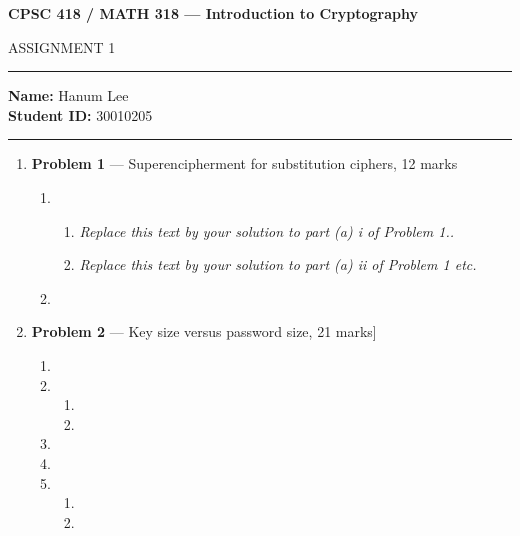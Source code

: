 \documentclass[11pt]{article}
\theoremstyle{definition}
\begin{document}
\begin{center}
{\bf \Large CPSC 418 / MATH 318 --- Introduction to Cryptography

ASSIGNMENT 1 %
}
\end{center}

\hrule 	

\textbf{Name:} Hanum Lee  \\
\textbf{Student ID:} 30010205 

\medskip \hrule

\begin{enumerate}

\item[] \textbf{Problem 1} --- Superencipherment for substitution ciphers, 12 marks

\begin{enumerate}
\item
\begin{enumerate}
\item \emph{Replace this text by your solution to part (a) i of Problem 1..}

\item \emph{Replace this text by your solution to part (a) ii of Problem 1 etc.}
\end{enumerate}

\item
\end{enumerate}


\item[] \textbf{Problem 2} --- Key size versus password size, 21 marks]



\begin{enumerate}
\item
\item

\begin{enumerate}
\item
\item
\end{enumerate}

\item

\item

\item
\begin{enumerate}
\item

\item
\end{enumerate}
\end{enumerate}




\end{enumerate}
\end{document}
